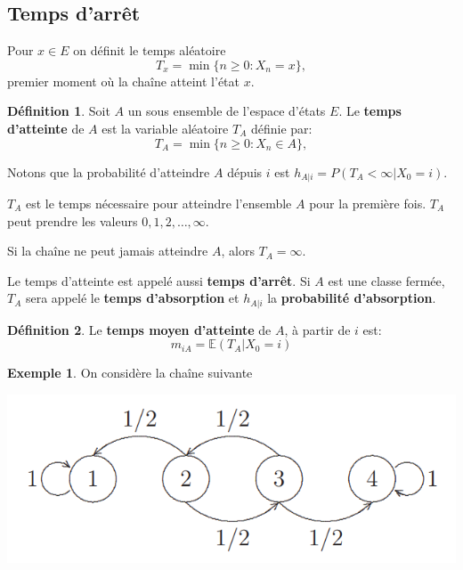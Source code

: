 \documentclass[
]{book}
\theoremstyle{definition}
\newtheorem{definition}{Définition}[chapter]
\theoremstyle{definition}
\newtheorem{example}{Exemple}[chapter]
\theoremstyle{definition}
\theoremstyle{remark}
\begin{document}
\hypertarget{temps-darruxeat}{%
\subsection{Temps d'arrêt}\label{temps-darruxeat}}

Pour \(x \in E\) on définit le temps aléatoire
\[
T_x = \min\{n \geq 0 : X_n = x\},
\]
premier moment où la chaîne atteint l'état \(x\).

\begin{definition}
\protect\hypertarget{def:unnamed-chunk-52}{}{\label{def:unnamed-chunk-52} }Soit \(A\) un sous ensemble de l'espace d'états \(E\). Le \textbf{temps d'atteinte} de \(A\) est la variable aléatoire \(T_A\) définie par:
\[
T_A = \min\{n \geq 0 : X_n \in A \},
\]
\end{definition}

Notons que la probabilité d'atteindre \(A\) dépuis \(i\) est \(h_{A|i} = P(T_A < \infty |X_0 = i)\).

\(T_A\) est le temps nécessaire pour atteindre l'ensemble \(A\) pour la première fois. \(T_A\) peut prendre les valeurs \(0,1,2,\ldots , \infty\).

Si la chaîne ne peut jamais atteindre \(A\), alors \(T_A= \infty\).

Le temps d'atteinte est appelé aussi \textbf{temps d'arrêt}. Si \(A\) est une classe fermée, \(T_A\) sera appelé le \textbf{temps d'absorption} et \(h_{A|i}\) la \textbf{probabilité d'absorption}.

\begin{definition}
\protect\hypertarget{def:unnamed-chunk-53}{}{\label{def:unnamed-chunk-53} }Le \textbf{temps moyen d'atteinte} de \(A\), à partir de \(i\) est:
\[ m_{iA}=\mathbb{E}\left(T_A | X_0=i \right)\]
\end{definition}

\begin{example}
\protect\hypertarget{exm:unnamed-chunk-54}{}{\label{exm:unnamed-chunk-54} }On considère la chaîne suivante
\end{example}

\begin{center}\includegraphics[width=0.45\linewidth]{images/graphe3} \end{center}
\end{document}
